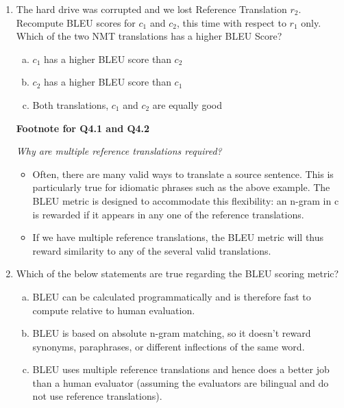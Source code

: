\begin{enumerate}[1.]
\begin{enumerate}[4a.]
\begin{enumerate}[(a)]
\item $c_1$ has a higher BLEU score than $c_2$
\item $c_2$ has a higher BLEU score than $c_1$
\item Both translations, $c_1$ and $c_2$ are equally good
\end{enumerate}


\item {}

The hard drive was corrupted and we lost Reference Translation $r_2$. Recompute BLEU scores for $c_1$ and $c_2$, this time with respect to $r_1$ only. Which of the two NMT translations has a higher BLEU Score?

\begin{enumerate}[(a)]
\item $c_1$ has a higher BLEU score than $c_2$
\item $c_2$ has a higher BLEU score than $c_1$
\item Both translations, $c_1$ and $c_2$ are equally good
\end{enumerate}


{\bf Footnote for Q4.1 and Q4.2}
{\em Why are multiple reference translations required?
\begin{itemize}
\item Often, there are many valid ways to translate a source sentence. This is particularly true for idiomatic phrases such as the above example. The BLEU metric is designed to accommodate this flexibility: an n-gram in c is rewarded if it appears in any one of the reference translations.
\item If we have multiple reference translations, the BLEU metric will thus reward similarity to any of the several valid translations.
\end{itemize}}

\item {}

Which of the below statements are true regarding the BLEU scoring metric?

\begin{enumerate}[(a)]
\item BLEU can be calculated programmatically and is therefore fast to compute relative to human evaluation.
\item BLEU is based on absolute n-gram matching, so it doesn't reward synonyms, paraphrases, or different inflections of the same word.
\item BLEU uses multiple reference translations and hence does a better job than a human evaluator (assuming the evaluators are bilingual and do not use reference translations).
\end{enumerate}


\end{enumerate}
\end{enumerate}

